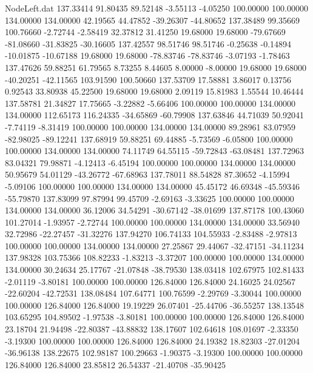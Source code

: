 \begin{filecontents}{NodeLeft.dat}
 137.33414   91.80435   89.52148    -3.55113   -4.05250  100.00000  100.00000  134.00000  134.00000   42.19565   44.47852  -39.26307  -44.80652
 137.38489   99.35669  100.76660    -2.72744   -2.58419   32.37812   31.41250   19.68000   19.68000  -79.67669  -81.08660  -31.83825  -30.16605
 137.42557   98.51746   98.51746    -0.25638   -0.14894  -10.01875  -10.67188   19.68000   19.68000  -78.83746  -78.83746   -3.07193   -1.78463
 137.47626   59.88251   61.79565     8.73255    8.44605    8.00000   -8.00000   19.68000   19.68000  -40.20251  -42.11565  103.91590  100.50660
 137.53709   17.58881    3.86017     0.13756    0.92543   33.80938   45.22500   19.68000   19.68000    2.09119   15.81983    1.55544   10.46444
 137.58781   21.34827   17.75665    -3.22882   -5.66406  100.00000  100.00000  134.00000  134.00000  112.65173  116.24335  -34.65869  -60.79908
 137.63846   44.71039   50.92041    -7.74119   -8.31419  100.00000  100.00000  134.00000  134.00000   89.28961   83.07959  -82.98025  -89.12241
 137.68919   59.88251   69.44885    -5.73569   -6.05800  100.00000  100.00000  134.00000  134.00000   74.11749   64.55115  -59.72843  -63.08481
 137.72963   83.04321   79.98871    -4.12413   -6.45194  100.00000  100.00000  134.00000  134.00000   50.95679   54.01129  -43.26772  -67.68963
 137.78011   88.54828   87.30652    -4.15994   -5.09106  100.00000  100.00000  134.00000  134.00000   45.45172   46.69348  -45.59346  -55.79870
 137.83099   97.87994   99.45709    -2.69163   -3.33625  100.00000  100.00000  134.00000  134.00000   36.12006   34.54291  -30.67142  -38.01699
 137.87178  100.43060  101.27014    -1.93957   -2.72744  100.00000  100.00000  134.00000  134.00000   33.56940   32.72986  -22.27457  -31.32276
 137.94270  106.74133  104.55933    -2.83488   -2.97813  100.00000  100.00000  134.00000  134.00000   27.25867   29.44067  -32.47151  -34.11234
 137.98328  103.75366  108.82233    -1.83213   -3.37207  100.00000  100.00000  134.00000  134.00000   30.24634   25.17767  -21.07848  -38.79530
 138.03418  102.67975  102.81433    -2.01119   -3.80181  100.00000  100.00000  126.84000  126.84000   24.16025   24.02567  -22.60204  -42.72531
 138.08484  107.64771  100.76599    -2.29769   -3.30044  100.00000  100.00000  126.84000  126.84000   19.19229   26.07401  -25.44706  -36.55257
 138.13548  103.65295  104.89502    -1.97538   -3.80181  100.00000  100.00000  126.84000  126.84000   23.18704   21.94498  -22.80387  -43.88832
 138.17607  102.64618  108.01697    -2.33350   -3.19300  100.00000  100.00000  126.84000  126.84000   24.19382   18.82303  -27.01204  -36.96138
 138.22675  102.98187  100.29663    -1.90375   -3.19300  100.00000  100.00000  126.84000  126.84000   23.85812   26.54337  -21.40708  -35.90425

\end{filecontents}
